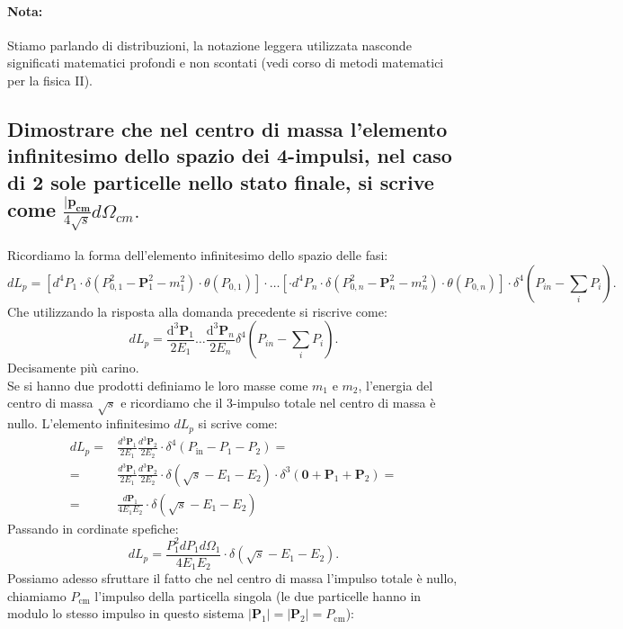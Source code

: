 \paragraph{Nota:}%
Stiamo parlando di distribuzioni, la notazione leggera utilizzata nasconde significati matematici profondi e non scontati (vedi corso di metodi matematici per la fisica II).

\subsection[\hspace{2mm} ]{Dimostrare che nel centro di massa l’elemento infinitesimo dello spazio dei 4-impulsi, nel caso di 2 sole particelle nello stato finale, si scrive come $\frac{|\boldsymbol{p_{cm}}}{4\sqrt{s}} d\Omega_{cm}.$}
Ricordiamo la forma dell'elemento infinitesimo dello spazio delle fasi:
\[
	dL_p = \left[ d^4P_1 \cdot \delta\left( P_{0,1}^2 - \boldsymbol{P}_1^2 - m_1^2 \right) \cdot \theta\left( P_{0,1} \right) \right] \cdot \ldots 
	\left[ \cdot d^4P_n \cdot \delta\left( P_{0,n}^2 - \boldsymbol{P}_n^2 - m_n^2 \right) \cdot \theta\left( P_{0,n} \right) \right] \cdot 
	\delta^4\left(  P_{in}-\sum_{i}P_i  \right) 
.\]
Che utilizzando la risposta alla domanda precedente si riscrive come:
\[
dL_p = \frac{\mbox{d}^3 \boldsymbol{P}_1}{2E_1} \ldots \frac{\mbox{d}^3 \boldsymbol{P}_n}{2E_n} \delta^4\left( P_{in}-\sum_{i}P_i \right) 
.\] 
Decisamente più carino.\\
Se si hanno due prodotti definiamo le loro masse come $m_1$ e  $m_2$, l'energia del centro di massa $\sqrt{s}$ e ricordiamo che il 3-impulso totale nel centro di massa è nullo. L'elemento infinitesimo $dL_p$ si scrive come:
\begin{align*}
	dL_p =& \frac{d^3 \boldsymbol{P}_1}{2E_1} \frac{d^3 \boldsymbol{P}_2}{2E_2} \cdot \delta^4\left(P_{\text{in}} - P_1 - P_2 \right) = \\ 
	= & \frac{d^3 \boldsymbol{P}_1}{2E_1} \frac{d^3 \boldsymbol{P}_2}{2E_2} \cdot \delta\left( \sqrt{s}-E_1-E_2\right) \cdot 
	\delta^3\left( \boldsymbol{0} + \boldsymbol{P}_1 + \boldsymbol{P}_2 \right) = \\
	= & \frac{ d \boldsymbol{P}_1 }{4E_1E_2} \cdot \delta\left( \sqrt{s}-E_1-E_2\right)   
\end{align*}
Passando in cordinate spefiche:
\[
	dL_p = \frac{P_1^2 dP_1 d \Omega_1 }{4E_1E_2} \cdot \delta\left( \sqrt{s} -E_1-E_2  \right) 
.\]
Possiamo adesso sfruttare il fatto che nel centro di massa l'impulso totale è nullo, chiamiamo $P_{\text{cm}}$ l'impulso della particella singola (le due particelle hanno in modulo lo stesso impulso in questo sistema $\left| \boldsymbol{P}_1 \right| = \left| \boldsymbol{P}_2 \right| = P_{\text{cm}}$):
